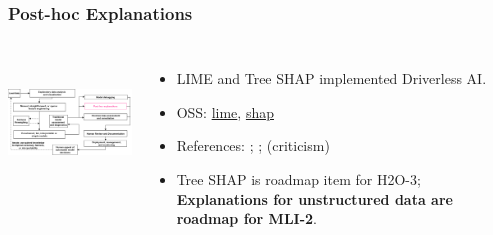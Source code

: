 \documentclass[11pt,
               aspectratio=169,
               hyperref={colorlinks}
               ]{beamer}
\begin{document}
			\begin{frame}
		
				\frametitle{Post-hoc Explanations}		
			
				\begin{columns}
	
					\centering
					\includegraphics[height=100pt]{img/exp.png}
				
					\vspace{-5pt}
					\begin{itemize}
						\item LIME and Tree SHAP implemented Driverless AI.
						\item OSS: \href{https://github.com/marcotcr/lime}{lime}, \href{https://github.com/slundberg/shap}{shap} 
						\item References: ; ;  (criticism)
						\item Tree SHAP is roadmap item for H2O-3; \textbf{Explanations for unstructured data are roadmap for MLI-2}.
					\end{itemize}
				
				\end{columns}
		
			\end{frame}
\end{document}
